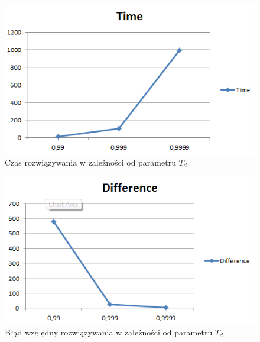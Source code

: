\documentclass[wide,a4paper,titlepage,12pt] {article}
\begin{document}
\begin{figure}[htbp]
  \begin{center}
         \includegraphics[scale=0.8]{time100.PNG}
         \caption{Czas rozwiązywania w zależności od parametru $T_d$}
  \end{center}
\end{figure}

\begin{figure}[htbp]
  \begin{center}
         \includegraphics[scale=0.8]{diff100.PNG}
         \caption{Błąd względny rozwiązywania w zależności od parametru $T_d$}
  \end{center}
\end{figure}
\newpage
\end{document}
